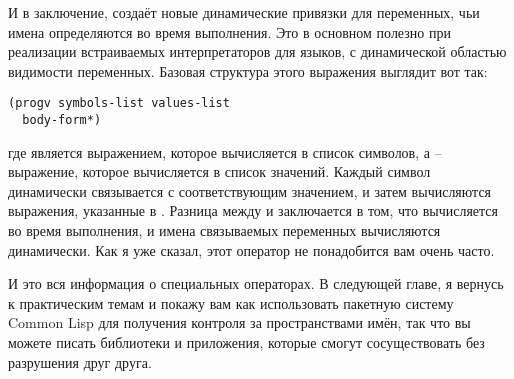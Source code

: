 И в заключение,  создаёт новые динамические привязки для переменных, чьи имена
определяются во время выполнения.  Это в основном полезно при реализации встраиваемых
интерпретаторов для языков, с динамической областью видимости переменных.  Базовая
структура этого выражения выглядит вот так:

\begin{lstlisting}
(progv symbols-list values-list
  body-form*)
\end{lstlisting}

где  является выражением, которое вычисляется в список символов, а
 -- выражение, которое вычисляется в список значений.  Каждый символ
динамически связывается с соответствующим значением, и затем вычисляются выражения,
указанные в .  Разница между  и  заключается в том,
что  вычисляется во время выполнения, и имена связываемых переменных
вычисляются динамически.  Как я уже сказал, этот оператор не понадобится вам очень часто.

И это вся информация о специальных операторах.  В следующей главе, я вернусь к
практическим темам и покажу вам как использовать пакетную систему Common Lisp для
получения контроля за пространствами имён, так что вы можете писать библиотеки и
приложения, которые смогут сосуществовать без разрушения друг друга.

